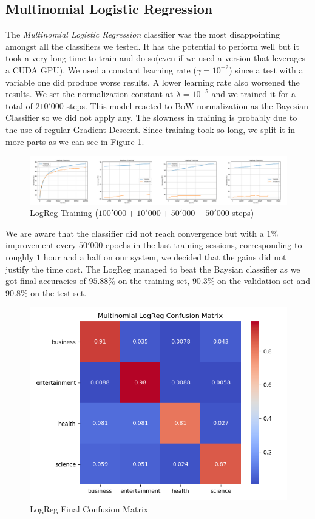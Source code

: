 \documentclass[10pt,a4paper]{report}
\begin{document}
\subsection{Multinomial Logistic Regression}
The \textit{Multinomial Logistic Regression} classifier was the most disappointing amongst all the classifiers we tested. It has the potential to perform well but it took a very long time to train and do so(even if we used a version that leverages a CUDA GPU). We used a constant learning rate ($\gamma=10^{-2}$) since a test with a variable one did produce worse results. A lower learning rate also worsened the results. We set the normalization constant at $\lambda=10^{-5}$ and we trained it for a total of $210'000$ steps. This model reacted to BoW normalization as the Bayesian Classifier so we did not apply any. The slowness in training is probably due to the use of regular Gradient Descent. Since training took so long, we split it in more parts as we can see in Figure \ref{fig:logreg_train}. 
\begin{figure}[!ht]
\centering
\includegraphics[width=\linewidth]{full_logreg_training.png}
\caption{LogReg Training ($100'000+ 10'000 + 50'000 + 50'000$ steps)}
\label{fig:logreg_train}
\end{figure}
We are aware that the classifier did not reach convergence but with a $1 \%$ improvement every $50'000$ epochs in the last training sessions, corresponding to roughly $1$ hour and a half on our system, we decided that the gains did not justify the time cost. The LogReg managed to beat the Baysian classifier as we got final accuracies of $95.88 \%$ on the training set, $90.3 \%$ on the validation set and $90.8 \%$ on the test set.  
\begin{figure}[!ht]
\centering
\includegraphics[width=0.5\linewidth]{logreg_confmat.png}
\caption{LogReg Final Confusion Matrix}
\label{fig:logreg_confmat}
\end{figure}
\end{document}
